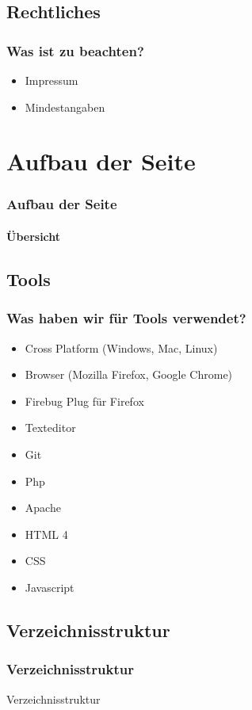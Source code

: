 \documentclass[xcolor=dvipsnames]{beamer}
\begin{document}
\subsection{Rechtliches}
\begin{frame} %
  \frametitle{Was ist zu beachten?} %
  \begin{block}{}
	\begin{itemize}
		\item Impressum
		\item Mindestangaben
	\end{itemize}
  \end{block}
\end{frame}


\section{Aufbau der Seite}
\begin{frame} %
  \frametitle{Aufbau der Seite} %
  \framesubtitle{Übersicht} %
\end{frame}


\subsection{Tools}
\begin{frame} %
  \frametitle{Was haben wir für Tools verwendet?} %
  \begin{block}{}
	  \begin{itemize}
		\item Cross Platform (Windows, Mac, Linux)
		\item Browser (Mozilla Firefox, Google Chrome)  	
		\item Firebug Plug für Firefox
  		\item Texteditor
	  	\item Git
		\item Php
		\item Apache
		\item HTML 4
		\item CSS
		\item Javascript
	  \end{itemize}
  \end{block}
\end{frame}


\subsection{Verzeichnisstruktur}
\begin{frame} %
  \frametitle{Verzeichnisstruktur} %
  \begin{block}{Verzeichnisstruktur}
  \end{block}
\end{frame}
\end{document}
